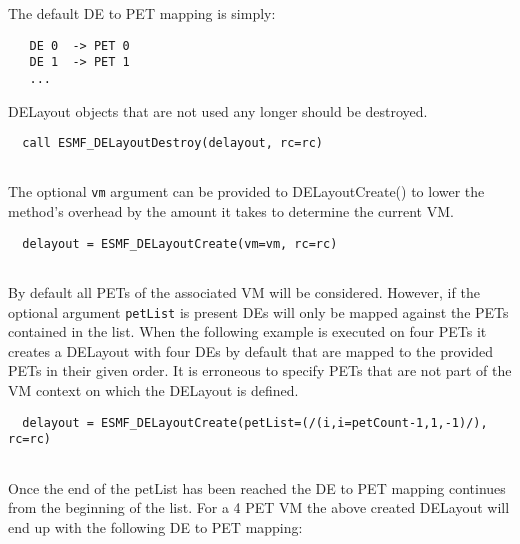 
   The default DE to PET mapping is simply:
   \begin{verbatim}
   DE 0  -> PET 0
   DE 1  -> PET 1
   ...
   \end{verbatim}
  
   DELayout objects that are not used any longer should be destroyed. 

 \begin{verbatim}
  call ESMF_DELayoutDestroy(delayout, rc=rc)
 
\end{verbatim}
 

   The optional {\tt vm} argument can be provided to DELayoutCreate() to lower 
   the method's overhead by the amount it takes to determine the current VM. 

 \begin{verbatim}
  delayout = ESMF_DELayoutCreate(vm=vm, rc=rc)
 
\end{verbatim}
 

   By default all PETs of the associated VM will be considered. However, if the 
   optional argument {\tt petList} is present DEs will only be mapped against
   the PETs contained in the list. When the following example is executed on
   four PETs it creates a DELayout with four DEs by default that are mapped 
   to the provided PETs in their given order. It is erroneous to specify PETs 
   that are not part of the VM context on which the DELayout is defined.  

 \begin{verbatim}
  delayout = ESMF_DELayoutCreate(petList=(/(i,i=petCount-1,1,-1)/), rc=rc)
 
\end{verbatim}
 

   Once the end of the petList has been reached the DE to PET mapping 
   continues from the beginning of the list. For a 4 PET VM the above created
   DELayout will end up with the following DE to PET mapping:
  
